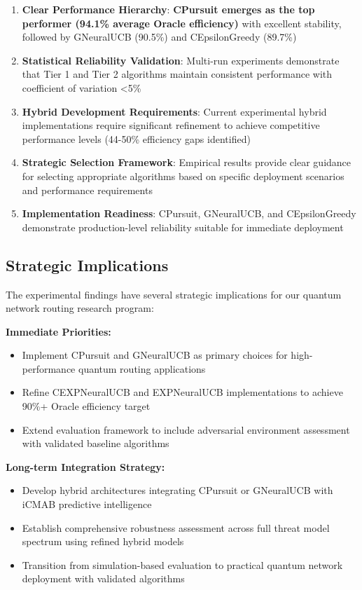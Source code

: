 \documentclass[12pt,a4paper]{article}
\newcommand{\success}[1]{\textcolor{successcolor}{\textbf{#1}}}
\begin{document}
\begin{enumerate}
\item \textbf{Clear Performance Hierarchy}: \success{CPursuit emerges as the top performer (94.1\% average Oracle efficiency)} with excellent stability, followed by GNeuralUCB (90.5\%) and CEpsilonGreedy (89.7\%)

\item \textbf{Statistical Reliability Validation}: Multi-run experiments demonstrate that Tier 1 and Tier 2 algorithms maintain consistent performance with coefficient of variation <5\%

\item \textbf{Hybrid Development Requirements}: Current experimental hybrid implementations require significant refinement to achieve competitive performance levels (44-50\% efficiency gaps identified)

\item \textbf{Strategic Selection Framework}: Empirical results provide clear guidance for selecting appropriate algorithms based on specific deployment scenarios and performance requirements

\item \textbf{Implementation Readiness}: CPursuit, GNeuralUCB, and CEpsilonGreedy demonstrate production-level reliability suitable for immediate deployment
\end{enumerate}

\subsection{Strategic Implications}

The experimental findings have several strategic implications for our quantum network routing research program:

\textbf{Immediate Priorities:}
\begin{itemize}
\item Implement CPursuit and GNeuralUCB as primary choices for high-performance quantum routing applications
\item Refine CEXPNeuralUCB and EXPNeuralUCB implementations to achieve 90\%+ Oracle efficiency target
\item Extend evaluation framework to include adversarial environment assessment with validated baseline algorithms
\end{itemize}

\textbf{Long-term Integration Strategy:}
\begin{itemize}
\item Develop hybrid architectures integrating CPursuit or GNeuralUCB with iCMAB predictive intelligence
\item Establish comprehensive robustness assessment across full threat model spectrum using refined hybrid models
\item Transition from simulation-based evaluation to practical quantum network deployment with validated algorithms
\end{itemize}
\end{document}
